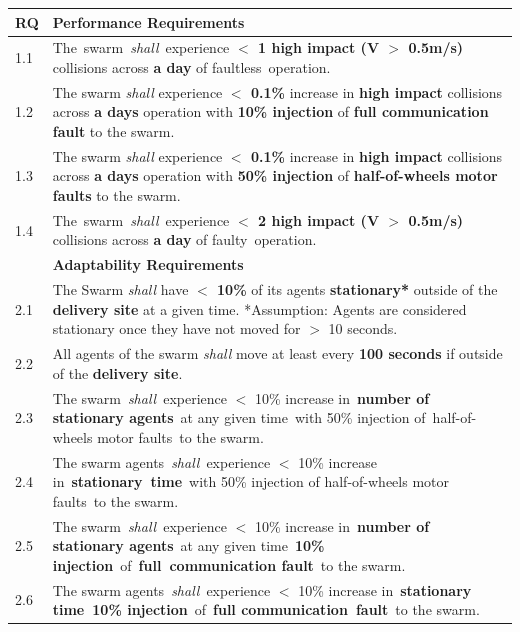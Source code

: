 \documentclass[runningheads]{llncs}
\begin{document}
\tiny
\begin{table}[!t]
	\centering
	\begin{tabular}{p{5mm} p{116mm} }
		RQ & \textbf{Performance Requirements}\\
		\hline
		1.1 & The swarm \emph{shall} experience \textbf{$<$ 1 high impact (V $>$ 0.5m/s)} collisions across \textbf{a day} of faultless operation. \\ 
		\hline
		1.2 & The swarm \emph{shall} experience \textbf{$<$ 0.1\%} increase in \textbf{high impact} collisions across \textbf{a days} operation with \textbf{10\% injection} of \textbf{full communication fault} to the swarm.\\ 
		\hline
		1.3 & The swarm \emph{shall} experience \textbf{$<$ 0.1\%} increase in \textbf{high impact} collisions across \textbf{a days} operation with \textbf{50\% injection} of \textbf{half-of-wheels motor faults} to the swarm.	\\	
		\hline
		1.4 & The swarm \emph{shall} experience \textbf{$<$ 2 high impact (V $>$ 0.5m/s)} collisions across \textbf{a day} of faulty operation.  \\		[1ex] 		
		\hline
		& \textbf{Adaptability Requirements}\\
		\hline
		2.1 & The Swarm \emph{shall} have \textbf{$<$ 10\%} of its agents \textbf{stationary*} outside of the \textbf{delivery site} at a given time.
		*Assumption: Agents are considered stationary once they have not moved for $>$ 10 seconds.
		\\ 
		\hline
		2.2 & All agents of the swarm \emph{shall} move at least every \textbf{100 seconds} if outside of the \textbf{delivery site}. \\ 
		\hline
		2.3 & The swarm \emph{shall} experience $<$ 10\% increase in \textbf{number of stationary agents} at any given time with 50\% injection of half-of-wheels motor faults to the swarm. \\
		\hline
		2.4 & The swarm agents \emph{shall} experience $<$ 10\% increase in \textbf{stationary time} with 50\% injection of half-of-wheels motor faults to the swarm.\\ 
		\hline
		2.5 & The swarm \emph{shall} experience $<$ 10\% increase in \textbf{number of stationary agents} at any given time \textbf{10\% injection} of \textbf{full communication fault} to the swarm.\\
		\hline
		2.6 & The swarm agents \emph{shall} experience $<$ 10\% increase in \textbf{stationary time 10\% injection} of \textbf{full communication fault} to the swarm. \\	

\end{tabular}
\end{table}
\end{document}
